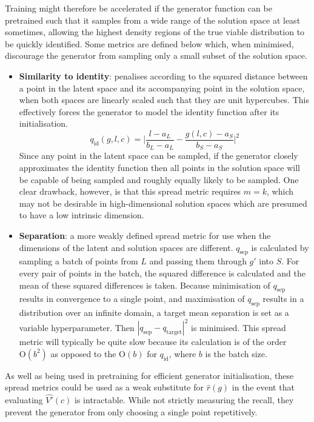 \documentclass[../../main.tex]{subfiles}
\begin{document}
Training might therefore be accelerated if the generator function can be pretrained such that it samples from a wide range of the solution space at least sometimes, allowing the highest density regions of the true viable distribution to be quickly identified.
Some metrics are defined below which, when minimised, discourage the generator from sampling only a small subset of the solution space.
\begin{itemize}
    \item[] \textbf{Similarity to identity}: penalises according to the squared distance between a point in the latent space and its accompanying point in the solution space, when both spaces are linearly scaled such that they are unit hypercubes.
    This effectively forces the generator to model the identity function after its initialisation.
    $$q_\text{id}(g,l,c)=\bigg|\frac{l-a_L}{b_L-a_L}-\frac{g(l,c)-a_S}{b_S-a_S}\bigg|^2$$
    Since any point in the latent space can be sampled, if the generator closely approximates the identity function then all points in the solution space will be capable of being sampled and roughly equally likely to be sampled.
    One clear drawback, however, is that this spread metric requires $m = k$, which may not be desirable in high-dimensional solution spaces which are presumed to have a low intrinsic dimension.
    \item[] \textbf{Separation}: a more weakly defined spread metric for use when the dimensions of the latent and solution spaces are different.
    $q_\text{sep}$ is calculated by sampling a batch of points from $L$ and passing them through $g'$ into $S$.
    For every pair of points in the batch, the squared difference is calculated and the mean of these squared differences is taken.
    Because minimisation of $q_\text{sep}$ results in convergence to a single point, and maximisation of $q_\text{sep}$ results in a distribution over an infinite domain, a target mean separation is set as a variable hyperparameter.
    Then $|q_\text{sep}-q_\text{target}|^2$ is minimised.
    This spread metric will typically be quite slow because its calculation is of the order $\text{O}(b^2)$ as opposed to the $\text{O}(b)$ for $q_\text{id}$, where $b$ is the batch size.
  \end{itemize}
As well as being used in pretraining for efficient generator initialisation, these spread metrics could be used as a weak substitute for $\hat{r}(g)$ in the event that evaluating $\hat{V'}(c)$ is intractable.
While not strictly measuring the recall, they prevent the generator from only choosing a single point repetitively.
\end{document}
